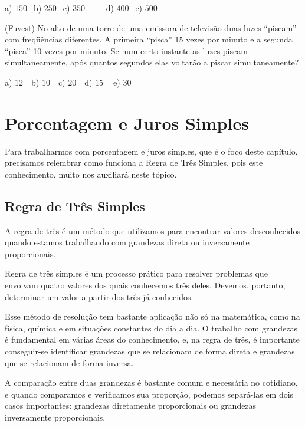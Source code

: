 \begin{multicols*}{2}
		      a) $150 \ \ $ b) $250 \ \ $ c) $350 \ \ \ \ \ \ \ \ \ \ $ d) $400 \ \ $ e) $500 \ \ $

		\execnum (Fuvest) No alto de uma torre de uma emissora de televisão duas luzes “piscam” com freqüências diferentes. A primeira “pisca” 15 vezes por minuto e a segunda “pisca” 10 vezes por minuto. Se num certo instante as luzes piscam simultaneamente, após quantos segundos elas voltarão a piscar simultaneamente?

		      a) $12 \ \ \ $ b) $10 \ \ \ $ c) $20 \ \ \ $ d) $15 \ \ \ \ $ e) $30 \ \ $


	
	\pagebreak
	\section{Porcentagem e Juros Simples}

	Para trabalharmos com porcentagem e juros simples, que é o foco deste capítulo, precisamos relembrar como funciona a Regra de Três Simples, pois este conhecimento, muito nos auxiliará neste tópico.

	\subsection{Regra de Três Simples}

	A regra de três é um método que utilizamos para encontrar valores desconhecidos quando estamos trabalhando com grandezas direta ou inversamente proporcionais.

	Regra de três simples é um processo prático para resolver problemas que envolvam quatro valores dos quais conhecemos três deles. Devemos, portanto, determinar um valor a partir dos três já conhecidos.

	Esse método de resolução tem bastante aplicação não só na matemática, como na física, química e em situações constantes do dia a dia. O trabalho com grandezas é fundamental em várias áreas do conhecimento, e, na regra de três, é importante conseguir-se identificar grandezas que se relacionam de forma direta e grandezas que se relacionam de forma inversa.

	A comparação entre duas grandezas é bastante comum e necessária no cotidiano, e quando comparamos e verificamos sua proporção, podemos separá-las em dois casos importantes: grandezas diretamente proporcionais ou grandezas inversamente proporcionais.


\end{multicols*}
